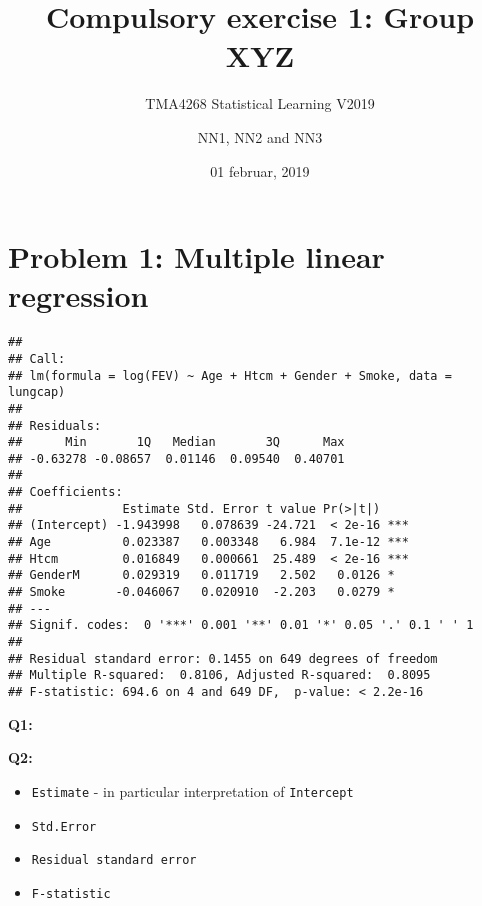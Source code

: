 \documentclass[]{article}
\title{Compulsory exercise 1: Group XYZ}
\subtitle{TMA4268 Statistical Learning V2019}
\author{NN1, NN2 and NN3}
\date{01 februar, 2019}
\newenvironment{Shaded}{\begin{snugshade}}{\end{snugshade}}
\newcommand{\KeywordTok}[1]{\textcolor[rgb]{0.13,0.29,0.53}{\textbf{#1}}}
\newcommand{\DataTypeTok}[1]{\textcolor[rgb]{0.13,0.29,0.53}{#1}}
\newcommand{\FloatTok}[1]{\textcolor[rgb]{0.00,0.00,0.81}{#1}}
\newcommand{\StringTok}[1]{\textcolor[rgb]{0.31,0.60,0.02}{#1}}
\newcommand{\OperatorTok}[1]{\textcolor[rgb]{0.81,0.36,0.00}{\textbf{#1}}}
\newcommand{\NormalTok}[1]{#1}
\providecommand{\tightlist}{%
  \setlength{\itemsep}{0pt}\setlength{\parskip}{0pt}}
\begin{document}
\maketitle

\section{Problem 1: Multiple linear
regression}\label{problem-1-multiple-linear-regression}

\begin{Shaded}
\end{Shaded}

\begin{verbatim}
## 
## Call:
## lm(formula = log(FEV) ~ Age + Htcm + Gender + Smoke, data = lungcap)
## 
## Residuals:
##      Min       1Q   Median       3Q      Max 
## -0.63278 -0.08657  0.01146  0.09540  0.40701 
## 
## Coefficients:
##              Estimate Std. Error t value Pr(>|t|)    
## (Intercept) -1.943998   0.078639 -24.721  < 2e-16 ***
## Age          0.023387   0.003348   6.984  7.1e-12 ***
## Htcm         0.016849   0.000661  25.489  < 2e-16 ***
## GenderM      0.029319   0.011719   2.502   0.0126 *  
## Smoke       -0.046067   0.020910  -2.203   0.0279 *  
## ---
## Signif. codes:  0 '***' 0.001 '**' 0.01 '*' 0.05 '.' 0.1 ' ' 1
## 
## Residual standard error: 0.1455 on 649 degrees of freedom
## Multiple R-squared:  0.8106, Adjusted R-squared:  0.8095 
## F-statistic: 694.6 on 4 and 649 DF,  p-value: < 2.2e-16
\end{verbatim}

\textbf{Q1:}

\textbf{Q2:}

\begin{itemize}
\tightlist
\item
  \texttt{Estimate} - in particular interpretation of \texttt{Intercept}
\item
  \texttt{Std.Error}
\item
  \texttt{Residual\ standard\ error}
\item
  \texttt{F-statistic}
\end{itemize}
\end{document}
